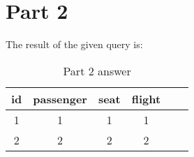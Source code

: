 \section{Part 2}
The result of the given query is:
\begin{table}[h!]
\centering         
\begin{tabular}{|c|c|c|c|c|c|} 
\hline             
id & passenger & seat & flight \\ 
\hline
1 & 1 & 1 & 1\\ 
\hline
2 & 2 & 2 & 2\\
\hline
\end{tabular}
\caption{Part 2 answer} 
\label{tab:example} 
\end{table}